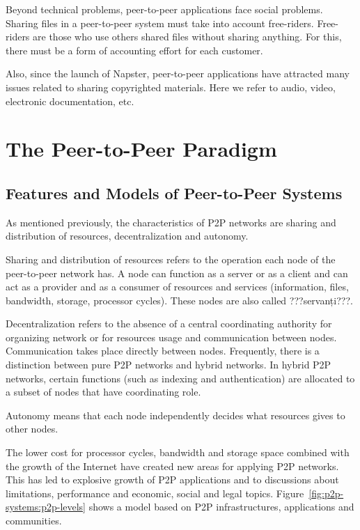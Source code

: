 Beyond technical problems, peer-to-peer applications face social problems.
Sharing files in a peer-to-peer system must take into account free-riders.
Free-riders are those who use others shared files without sharing anything. For
this, there must be a form of accounting effort for each customer.

Also, since the launch of Napster, peer-to-peer applications have attracted
many issues related to sharing copyrighted materials. Here we refer to audio,
video, electronic documentation, etc.

\section{The Peer-to-Peer Paradigm}
\label{sec:p2p-systems:paragigm}

\subsection{Features and Models of Peer-to-Peer Systems}

As mentioned previously, the characteristics of P2P networks are sharing and
distribution of resources, decentralization and autonomy.

Sharing and distribution of resources refers to the operation each node of the
peer-to-peer network has. A node can function as a server or as a client and
can act as a provider and as a consumer of resources and services (information,
files, bandwidth, storage, processor cycles). These nodes are also called
???servanți???.

Decentralization refers to the absence of a central coordinating authority for
organizing network or for resources usage and communication between nodes.
Communication takes place directly between nodes. Frequently, there is a
distinction between pure P2P networks and hybrid networks. In hybrid P2P
networks, certain functions (such as indexing and authentication) are allocated
to a subset of nodes that have coordinating role.

Autonomy means that each node independently decides what resources gives to
other nodes.

The lower cost for processor cycles, bandwidth and storage space combined with
the growth of the Internet have created new areas for applying P2P networks.
This has led to explosive growth of P2P applications and to discussions about
limitations, performance and economic, social and legal topics.
Figure~\ref{fig:p2p-systems:p2p-levels} shows a model based on P2P
infrastructures, applications and communities.

